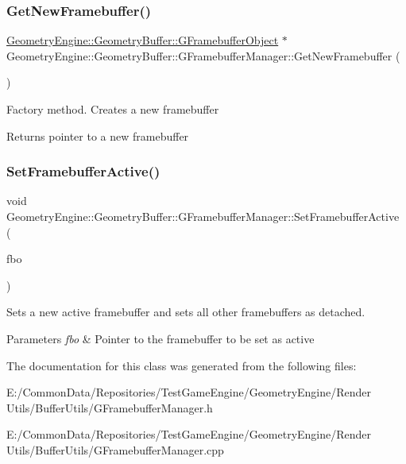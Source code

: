 \subsubsection{\texorpdfstring{GetNewFramebuffer()}{GetNewFramebuffer()}}
{\footnotesize\ttfamily \mbox{\hyperlink{class_geometry_engine_1_1_geometry_buffer_1_1_g_framebuffer_object}{Geometry\+Engine\+::\+Geometry\+Buffer\+::\+G\+Framebuffer\+Object}} $\ast$ Geometry\+Engine\+::\+Geometry\+Buffer\+::\+G\+Framebuffer\+Manager\+::\+Get\+New\+Framebuffer (\begin{DoxyParamCaption}{ }\end{DoxyParamCaption})}

Factory method. Creates a new framebuffer \begin{DoxyReturn}{Returns}
pointer to a new framebuffer 
\end{DoxyReturn}
\mbox{\label{class_geometry_engine_1_1_geometry_buffer_1_1_g_framebuffer_manager_a8f42a16dacecdc9422b88c71cfb38889}} 
\subsubsection{\texorpdfstring{SetFramebufferActive()}{SetFramebufferActive()}}
{\footnotesize\ttfamily void Geometry\+Engine\+::\+Geometry\+Buffer\+::\+G\+Framebuffer\+Manager\+::\+Set\+Framebuffer\+Active (\begin{DoxyParamCaption}\item[{\mbox{\hyperlink{class_geometry_engine_1_1_geometry_buffer_1_1_g_framebuffer_object}{G\+Framebuffer\+Object}} $\ast$}]{fbo }\end{DoxyParamCaption})}

Sets a new active framebuffer and sets all other framebuffers as detached. 
\begin{DoxyParams}{Parameters}
{\em fbo} & Pointer to the framebuffer to be set as active \\
\hline
\end{DoxyParams}


The documentation for this class was generated from the following files\+:\begin{DoxyCompactItemize}
\item 
E\+:/\+Common\+Data/\+Repositories/\+Test\+Game\+Engine/\+Geometry\+Engine/\+Render Utils/\+Buffer\+Utils/G\+Framebuffer\+Manager.\+h\item 
E\+:/\+Common\+Data/\+Repositories/\+Test\+Game\+Engine/\+Geometry\+Engine/\+Render Utils/\+Buffer\+Utils/G\+Framebuffer\+Manager.\+cpp\end{DoxyCompactItemize}
